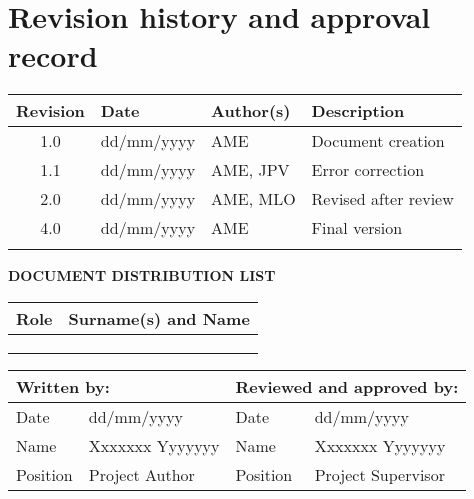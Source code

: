 \vspace*{0cm}

\chapter*{Revision history and approval record}
  
\begin{tabularx}{\textwidth}{|c|l|l|X|}
  \hline
  \textbf{Revision} & \textbf{Date} & \textbf{Author(s)} & \textbf{Description} \\
  \hline
  1.0 & dd/mm/yyyy & AME & Document creation \\
  \hline
  1.1 & dd/mm/yyyy & AME, JPV & Error correction \\
  \hline
  2.0 & dd/mm/yyyy & AME, MLO & Revised after review \\
  \hline
  4.0 & dd/mm/yyyy & AME & Final version \\
  \hline
  & & & \\
  \hline
\end{tabularx}

\vspace{1cm}

\textbf{DOCUMENT DISTRIBUTION LIST}

\begin{tabularx}{\textwidth}{|l|X|}
  \hline
    \textbf{Role} & \textbf{Surname(s) and Name} \\
  \hline
    [Student] &  \\
  \hline
    [Project Supervisor 1] &  \\
  \hline
    [Project Supervisor 2 (if applicable)] &  \\
  \hline
\end{tabularx}

\vspace{1cm}

\begin{tabularx}{\textwidth}{|l|X||l|X|}
  \hline
    \multicolumn{2}{|l||}{\textbf{Written by:}}  &  \multicolumn{2}{l|}{\textbf{Reviewed and approved by:}} \\
  \hline
    Date &  dd/mm/yyyy & Date &  dd/mm/yyyy \\
  \hline
    Name &  Xxxxxxx Yyyyyyy & Name &  Xxxxxxx Yyyyyyy \\
  \hline
    Position & Project Author & Position & Project Supervisor \\
  \hline
\end{tabularx}
